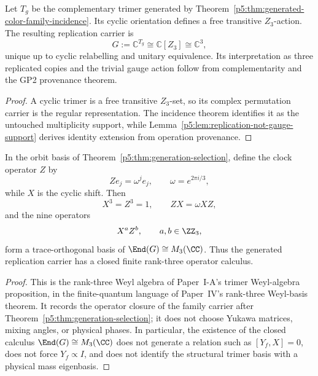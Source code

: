 \documentclass[12pt,a4paper]{article}
\begin{document}
\begin{theorem}
\label{p5:thm:generation-selection}
Let \(T_g\) be the complementary trimer generated by
Theorem~\ref{p5:thm:generated-color-family-incidence}.  Its cyclic orientation
defines a free transitive
\(Z_3\)-action.  The resulting replication carrier is
\[
G:=\mathbb C^{T_g}\cong\mathbb C[Z_3]\cong\mathbb C^3,
\]
unique up to cyclic relabelling and unitary equivalence.  Its interpretation
as three replicated copies and the trivial gauge action follow from
complementarity and the GP2 provenance theorem.
\end{theorem}

\begin{proof}
A cyclic trimer is a free transitive \(Z_3\)-set, so its complex permutation
carrier is the regular representation.  The incidence theorem identifies it
as the untouched multiplicity support, while
Lemma~\ref{p5:lem:replication-not-gauge-support} derives identity extension
from operation provenance.
\end{proof}

\begin{corollary}
\label{p5:cor:family-weyl-closure}
In the orbit basis of Theorem~\ref{p5:thm:generation-selection}, define the clock operator \(Z\) by
\[
Ze_j=\omega^j e_j,
\qquad
\omega=e^{2\pi i/3},
\]
while \(X\) is the cyclic shift.  Then
\[
X^3=Z^3=1,
\qquad
ZX=\omega XZ,
\]
and the nine operators
\[
X^aZ^b,
\qquad a,b\in\ZZ_3,
\]
form a trace-orthogonal basis of \(\End(G)\cong M_3(\CC)\).  Thus the generated
replication carrier has a closed finite rank-three operator calculus.
\end{corollary}

\begin{proof}
This is the rank-three Weyl algebra of Paper~I-A's trimer Weyl-algebra proposition, in the finite-quantum language of Paper~IV's rank-three Weyl-basis theorem.  It records the operator closure of the family carrier after Theorem~\ref{p5:thm:generation-selection}; it does not choose Yukawa matrices, mixing angles, or physical phases.  In particular, the existence of the closed calculus
\(\End(G)\cong M_3(\CC)\) does not generate a relation such as
\([Y_f,X]=0\), does not force \(Y_f\propto I\), and does not identify the
structural trimer basis with a physical mass eigenbasis.
\end{proof}
\end{document}
